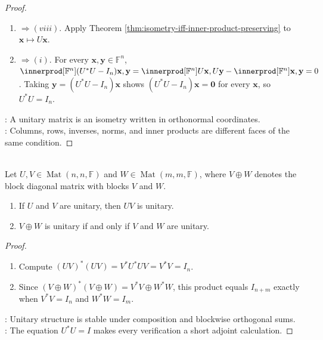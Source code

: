 \begin{theorem}
\begin{proof}
\begin{enumerate}[label=(\roman*).]
\item[$(vii)$]$\Rightarrow (viii)$. Apply Theorem \ref{thm:isometry-iff-inner-product-preserving} to $\mathbf{x}\mapsto U\mathbf{x}$.
\item[$(viii)$]$\Rightarrow (i)$. For every $\mathbf{x},\mathbf{y}\in\mathbb{F}^n$, $\innerprod[\mathbb{F}^n]{(U^*U-I_n)\mathbf{x},\mathbf{y}} =\innerprod[\mathbb{F}^n]{U\mathbf{x},U\mathbf{y}}-\innerprod[\mathbb{F}^n]{\mathbf{x},\mathbf{y}} =0$. Taking $\mathbf{y}=(U^*U-I_n)\mathbf{x}$ shows $(U^*U-I_n)\mathbf{x}=\mathbf{0}$ for every $\mathbf{x}$, so $U^*U=I_n$.
\end{enumerate}
: A unitary matrix is an isometry written in orthonormal coordinates.\\
: Columns, rows, inverses, norms, and inner products are different faces of the same condition.
\end{proof}
\end{theorem}

\begin{proposition} \label{prop:algebra-of-unitary-matrices} \\
Let $U,V\in\operatorname{Mat}(n,n,\mathbb{F})$ and $W\in\operatorname{Mat}(m,m,\mathbb{F})$, where $V\oplus W$ denotes the block diagonal matrix with blocks $V$ and $W$.
\begin{enumerate}[label=\roman*.]
\setlength{\itemsep}{0pt}
\item If $U$ and $V$ are unitary, then $UV$ is unitary.
\item $V\oplus W$ is unitary if and only if $V$ and $W$ are unitary.
\end{enumerate}
\begin{proof}
\begin{enumerate}[label=(\roman*)]
\setlength{\itemsep}{0pt}
\item Compute $(UV)^*(UV)=V^*U^*UV=V^*V=I_n$.
\item Since $(V\oplus W)^*(V\oplus W)=V^*V\oplus W^*W$, this product equals $I_{n+m}$ exactly when $V^*V=I_n$ and $W^*W=I_m$.
\end{enumerate}
: Unitary structure is stable under composition and blockwise orthogonal sums.\\
: The equation $U^*U=I$ makes every verification a short adjoint calculation.
\end{proof}
\end{proposition}

